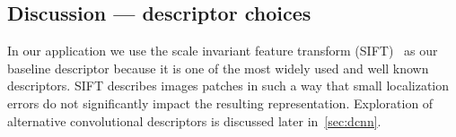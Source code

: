     \subsection{Discussion --- descriptor choices}
        In our application we use the scale invariant feature transform
          (SIFT)~\cite{lowe_distinctive_2004} as our baseline descriptor
          because it is one of the most widely used and well known
          descriptors.
        SIFT describes images patches in such a way that small
          localization errors do not significantly impact the resulting
          representation.
        Exploration of alternative convolutional descriptors is
          discussed later in~\cref{sec:dcnn}.
